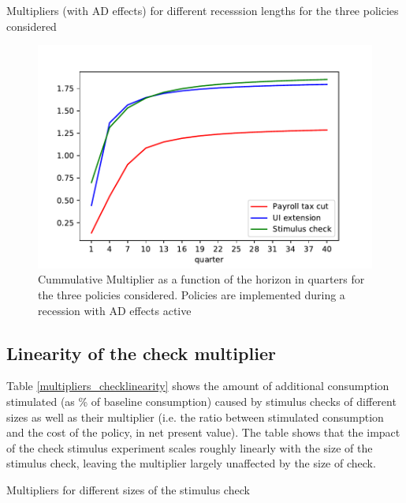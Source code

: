 \documentclass[../HAFiscal]{subfiles}
\begin{document}
\begin{table} 
	\center
	
	\caption{Multipliers (with AD effects) for different recesssion lengths for the three policies considered}
	\label{tab:Multiplier_RecLengths}
\end{table}

\begin{figure}
	\centering
	\includegraphics[width=0.8\linewidth]{Code/HA-Models/FromPandemicCode/Figures/Cummulative_multipliers}
	\caption{Cummulative Multiplier as a function of the horizon in quarters for the three policies considered. Policies are implemented during a recession with AD effects active}
	\label{fig:cummulativemultipliers}
\end{figure}



\subsection{Linearity of the check multiplier}

Table \ref{multipliers_checklinearity} shows the amount of additional consumption stimulated (as \% of baseline consumption) caused by stimulus checks of different sizes as well as their multiplier (i.e. the ratio between stimulated consumption and the cost of the policy, in net present value). The table shows that the impact of the check stimulus experiment scales roughly linearly with the size of the stimulus check, leaving the multiplier largely unaffected by the size of check.

\begin{table} 
	\center
	
	\caption{Multipliers for different sizes of the stimulus check}
	\label{multipliers_checklinearity}
\end{table}
\end{document}
